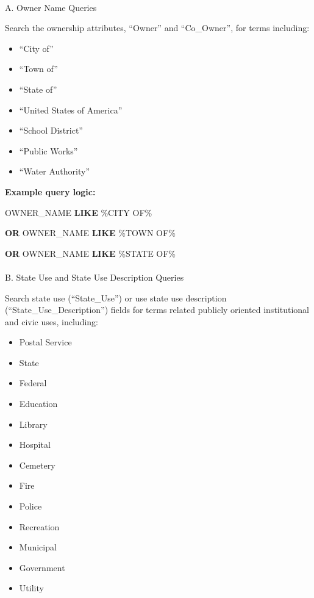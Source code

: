 \documentclass[
  letterpaper,
  DIV=11,
  numbers=noendperiod]{scrreprt}
\makeatletter
\let\oldparagraph\paragraph
\renewcommand{\paragraph}{
    \@ifstar
      \xxxParagraphStar
      \xxxParagraphNoStar
  }
\newcommand{\xxxParagraphStar}[1]{\oldparagraph*{#1}\mbox{}}
\newcommand{\xxxParagraphNoStar}[1]{\oldparagraph{#1}\mbox{}}
\newenvironment{Shaded}{\begin{snugshade}}{\end{snugshade}}
\newcommand{\KeywordTok}[1]{\textcolor[rgb]{0.00,0.23,0.31}{\textbf{#1}}}
\newcommand{\NormalTok}[1]{\textcolor[rgb]{0.00,0.23,0.31}{#1}}
\newcommand{\StringTok}[1]{\textcolor[rgb]{0.13,0.47,0.30}{#1}}
\providecommand{\tightlist}{%
  \setlength{\itemsep}{0pt}\setlength{\parskip}{0pt}}
\makeatother
\begin{document}
\paragraph{A. Owner Name Queries}\label{a.-owner-name-queries}

Search the ownership attributes, ``Owner'' and ``Co\_Owner'', for terms
including:

\begin{itemize}
\tightlist
\item
  ``City of''
\item
  ``Town of''
\item
  ``State of''
\item
  ``United States of America''
\item
  ``School District''
\item
  ``Public Works''
\item
  ``Water Authority''
\end{itemize}

\textbf{Example query logic:}

\begin{Shaded}
\begin{Highlighting}[]
\NormalTok{OWNER\_NAME }\KeywordTok{LIKE} \StringTok{\textquotesingle{}\%CITY OF\%\textquotesingle{}}

\KeywordTok{OR}\NormalTok{ OWNER\_NAME }\KeywordTok{LIKE} \StringTok{\textquotesingle{}\%TOWN OF\%\textquotesingle{}}

\KeywordTok{OR}\NormalTok{ OWNER\_NAME }\KeywordTok{LIKE} \StringTok{\textquotesingle{}\%STATE OF\%\textquotesingle{}}
\end{Highlighting}
\end{Shaded}

\paragraph{B. State Use and State Use Description
Queries}\label{b.-state-use-and-state-use-description-queries}

Search state use (``State\_Use'') or use state use description
(``State\_Use\_Description'') fields for terms related publicly oriented
institutional and civic uses, including:

\begin{itemize}
\tightlist
\item
  Postal Service
\item
  State
\item
  Federal
\item
  Education
\item
  Library
\item
  Hospital
\item
  Cemetery
\item
  Fire
\item
  Police
\item
  Recreation
\item
  Municipal
\item
  Government
\item
  Utility
\end{itemize}
\end{document}
